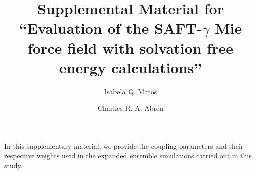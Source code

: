 \documentclass[preprint,12p,times]{elsarticle}
\begin{document}
	\begin{frontmatter}
		
		\title{Supplemental Material for ``Evaluation of the SAFT-$\gamma$ Mie force field with solvation free energy calculations''}%
		
		\author{Isabela Q. Matos}
		\author{Charlles R. A. Abreu }
		\address{Chemical Engineering Department, Escola de Qu\'{i}mica, Universidade Federal do Rio de Janeiro, Av. Athos da Silveira Ramos 149, Rio de Janeiro, RJ 21941-909, Brazil}
		
	\end{frontmatter}




In this supplementary material, we provide the coupling parameters and their respective weights used in the expanded ensemble simulations carried out in this study. 

\renewcommand{\thetable}{S\arabic{table}} %
\end{document}
